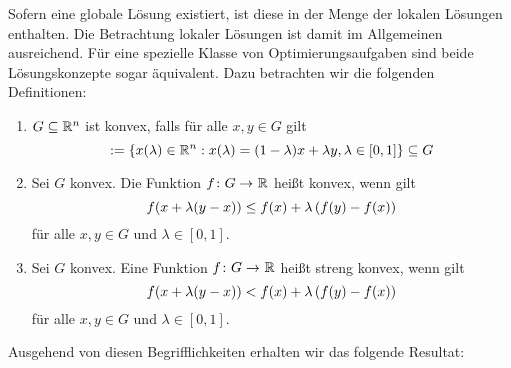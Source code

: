 Sofern eine globale Lösung existiert, ist diese in der Menge der lokalen Lösungen enthalten. Die Betrachtung lokaler Lösungen ist damit im Allgemeinen ausreichend. Für eine spezielle Klasse von Optimierungsaufgaben sind beide Lösungskonzepte sogar äquivalent. Dazu betrachten wir die folgenden Definitionen:

\begin{definition}[Konvexität] %
	\begin{enumerate}[nolistsep]
		\item $G \subseteq \mathbb{R}^n$ ist konvex, falls für alle $x,y \in G$ gilt
		\begin{equation*}
			[x,y] \defeq \menge{x(\lambda) \in \Rn : x(\lambda) = (1-\lambda)x + \lambda y, \lambda \in [0,1]} \subseteq G
		\end{equation*}
		\item Sei $G$ konvex. Die Funktion $\abb{f}{G}{\R}$ heißt konvex, wenn gilt
		\begin{equation*}
			f(x + \lambda (y-x)) \le f(x) + \lambda \left( f(y) - f(x) \right)
		\end{equation*}
		für alle $x,y \in G$ und $\lambda \in [0,1]$.
		\item  Sei $G$ konvex. Eine Funktion $\abb{f}{G}{\R}$ heißt streng konvex, wenn gilt
		\begin{equation*}
			f(x + \lambda (y-x)) < f(x) + \lambda \left( f(y) - f(x) \right)
		\end{equation*}
		für alle $x,y \in G$ und $\lambda \in [0,1]$.
	\end{enumerate}
\end{definition}


Ausgehend von diesen Begrifflichkeiten erhalten wir das folgende Resultat:

